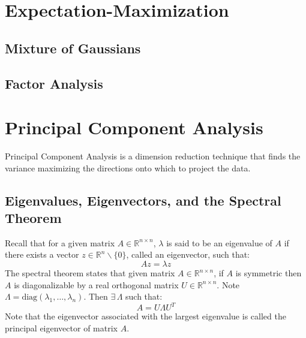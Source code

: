 \documentclass[twoside,twocolumn]{article}
\begin{document}
\section{Expectation-Maximization}
\subsection{Mixture of Gaussians}
\subsection{Factor Analysis}
\section{Principal Component Analysis}
Principal Component Analysis is a dimension reduction technique that finds
the variance maximizing the directions onto which to project the data.
\subsection{Eigenvalues, Eigenvectors, and the Spectral Theorem}
Recall that for a given matrix $A\in \mathbb{R}^{n \times n}$, $\lambda$ is said
to be an eigenvalue of $A$ if there exists a vector
$z \in \mathbb{R}^n \backslash \{ 0 \}$, called an eigenvector, such that:
\begin{equation}
  Az=\lambda z
\end{equation}
The spectral theorem states that given matrix $A\in \mathbb{R}^{n \times n}$, if
$A$ is symmetric then $A$ is diagonalizable by a real orthogonal matrix
$U\in \mathbb{R}^{n \times n}$. Note
$\Lambda = \textrm{diag}(\lambda_1, \hdots, \lambda_n)$. Then $\exists \, \Lambda$
such that:
\begin{equation}
  A=U\Lambda U^T
\end{equation}
Note that the eigenvector associated with the largest eigenvalue is called the
principal eigenvector of matrix $A$.
\end{document}
